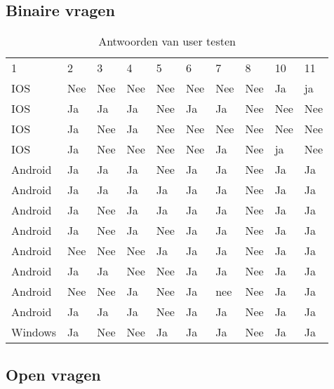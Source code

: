 \subsection{Binaire vragen}
	\begin{table}[H]
		\centering
		\begin{tabular}{llllllllll}
			1 &  2 & 3 & 4 & 5 & 6 & 7 & 8 & 10 &11\\
			IOS & Nee & Nee & Nee & Nee & Nee & Nee & Nee & Ja & ja \\
			IOS & Ja & Ja & Ja & Nee & Ja & Ja & Nee & Nee & Nee \\
			IOS & Ja & Nee & Ja & Nee & Nee & Nee & Nee & Nee & Nee \\
			IOS & Ja & Nee & Nee & Nee & Nee & Ja & Nee & ja & Nee \\
			Android & Ja & Ja & Ja & Nee & Ja & Ja & Nee & Ja & Ja \\
			Android & Ja & Ja & Ja & Ja & Ja & Ja & Nee & Ja & Ja \\
			Android & Ja & Nee & Ja & Ja & Ja & Ja & Nee & Ja & Ja \\
			Android & Ja & Nee & Ja & Nee & Ja & Ja & Nee & Ja & Ja \\
			Android & Nee & Nee & Nee & Ja & Ja & Ja & Nee & Ja & Ja \\
			Android & Ja & Ja & Nee & Nee & Ja & Ja & Nee & Ja & Ja \\
			Android & Nee & Nee & Ja & Nee & Ja & nee & Nee & Ja & Ja \\
			Android & Ja & Ja & Ja & Nee & Ja & Ja & Nee & Ja & Ja \\
			Windows & Ja & Nee & Nee & Ja & Ja & Ja & Nee & Ja & Ja \\
		\end{tabular}	
		\caption{Antwoorden van user testen}
	\end{table}
	
\subsection{Open vragen}
